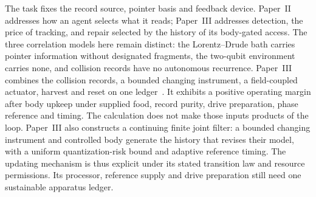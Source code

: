 \documentclass[12pt]{article}
\begin{document}
The task fixes the record source, pointer basis and feedback device. Paper~II addresses how an agent selects what it reads; Paper~III addresses detection, the price of tracking, and repair selected by the history of its body-gated access. The three correlation models here remain distinct: the Lorentz--Drude bath carries pointer information without designated fragments, the two-qubit environment carries none, and collision records have no autonomous recurrence. Paper~III combines the collision records, a bounded changing instrument, a field-coupled actuator, harvest and reset on one ledger~\cite{Liu2026TDOME_III}. It exhibits a positive operating margin after body upkeep under supplied food, record purity, drive preparation, phase reference and timing. The calculation does not make those inputs products of the loop. Paper~III also constructs a continuing finite joint filter: a bounded changing instrument and controlled body generate the history that revises their model, with a uniform quantization-risk bound and adaptive reference timing. The updating mechanism is thus explicit under its stated transition law and resource permissions. Its processor, reference supply and drive preparation still need one sustainable apparatus ledger.
\end{document}
